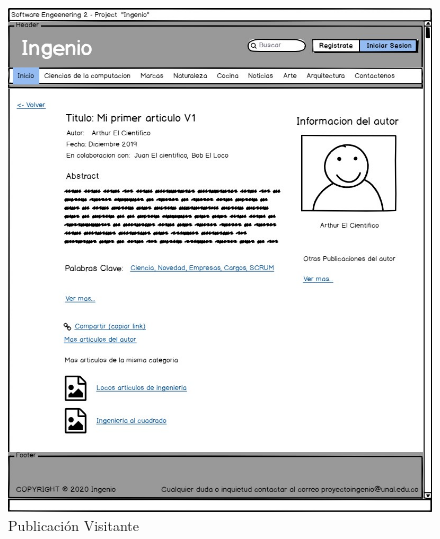 \documentclass[a4paper,12 pt]{article}
\begin{document}
\begin{figure}[H]
    \centering
    \includegraphics[scale = 0.7]{images/PublicacionVisitante.jpg}
    \caption{Publicación Visitante}
    \label{F110}
\end{figure}{}
\end{document}

